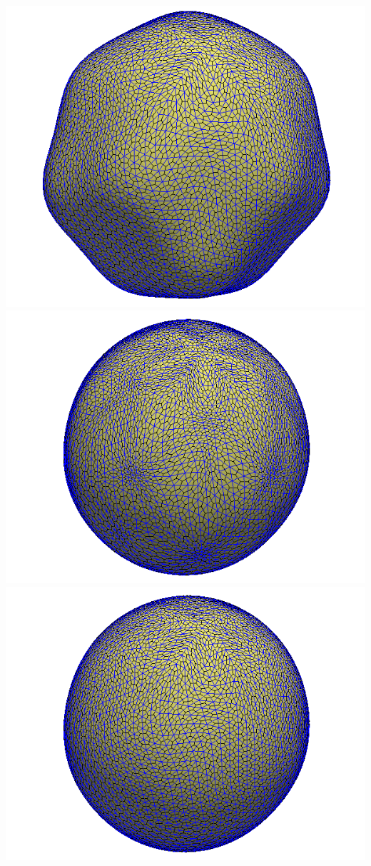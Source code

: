 \documentclass[portrait,a0]{a0poster}
\begin{document}
\begin{multicols}{3}
\begin{center}
		\hspace{0.1\linewidth}
		\includegraphics[width=0.35\linewidth]{bumpy_omega100_level5_tstep50.png}
		\newline
		\includegraphics[width=0.35\linewidth]{bumpy_noRed_level5_tstep128.png}
		\hspace{0.1\linewidth}
		\includegraphics[width=0.35\linewidth]{bumpy_omega100_level5_tstep128.png}
		\newline
		\vspace{-20pt}
		\label{fig:bumpy_sphere} 
	\end{center}


\end{multicols}
\end{document}
